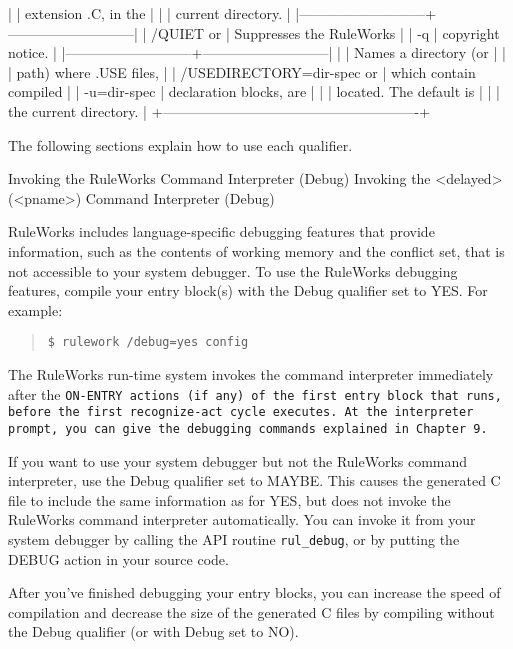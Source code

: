 |                           | extension .C, in the      |
|                           | current directory.        |
|---------------------------+---------------------------|
| /QUIET or                 | Suppresses the RuleWorks  |
| -q                        | copyright notice.         |
|---------------------------+---------------------------|
|                           | Names a directory (or     |
|                           | path) where .USE files,   |
| /USEDIRECTORY=dir-spec or | which contain compiled    |
| -u=dir-spec               | declaration blocks, are   |
|                           | located. The default is   |
|                           | the current directory.    |
+-------------------------------------------------------+

The following sections explain how to use each
qualifier.

Invoking the RuleWorks Command Interpreter (Debug)
Invoking the <delayed>(<pname>) Command Interpreter
(Debug)

RuleWorks includes language-specific debugging features
that provide information, such as the contents of working
memory and the conflict set, that is not accessible to
your system debugger. To use the RuleWorks debugging
features, compile your entry block(s) with the Debug
qualifier set to YES. For example:
\begin{quote}
\begin{verbatim}
$ rulework /debug=yes config
\end{verbatim}
\end{quote}  
The RuleWorks run-time system invokes the command
interpreter immediately after the \tt{ON-ENTRY} actions (if
any) of the first entry block that runs, before the first
recognize-act cycle executes. At the interpreter prompt,
you can give the debugging commands explained in Chapter
9.

If you want to use your system debugger but not the
RuleWorks command interpreter, use the Debug qualifier
set to MAYBE. This causes the generated C file to include
the same information as for YES, but does not invoke the
RuleWorks command interpreter automatically. You can
invoke it from your system debugger by calling the API
routine \verb|rul_debug|, or by putting the DEBUG action in your
source code.

After you've finished debugging your entry blocks, you
can increase the speed of compilation and decrease the
size of the generated C files by compiling without the
Debug qualifier (or with Debug set to NO).

